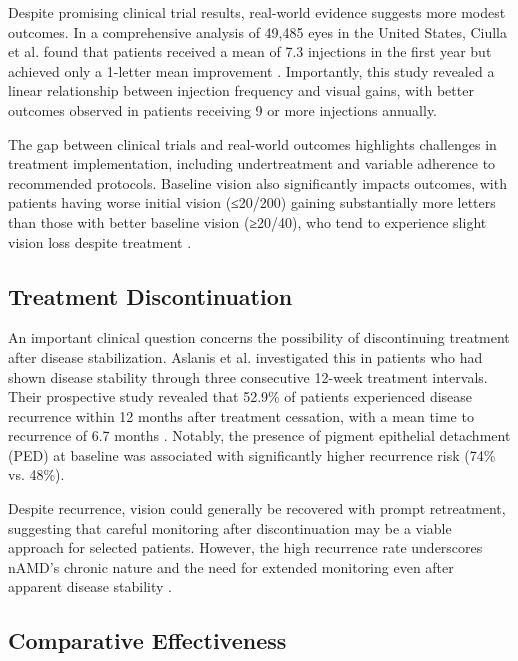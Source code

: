 Despite promising clinical trial results, real-world evidence suggests more modest outcomes. In a comprehensive analysis of 49,485 eyes in the United States, Ciulla et al. found that patients received a mean of 7.3 injections in the first year but achieved only a 1-letter mean improvement \citep{ciullaVisualAcuityOutcomes2020}. Importantly, this study revealed a linear relationship between injection frequency and visual gains, with better outcomes observed in patients receiving 9 or more injections annually.

The gap between clinical trials and real-world outcomes highlights challenges in treatment implementation, including undertreatment and variable adherence to recommended protocols. Baseline vision also significantly impacts outcomes, with patients having worse initial vision (≤20/200) gaining substantially more letters than those with better baseline vision (≥20/40), who tend to experience slight vision loss despite treatment \citep{ciullaVisualAcuityOutcomes2020}.

\subsection{Treatment Discontinuation}

An important clinical question concerns the possibility of discontinuing treatment after disease stabilization. Aslanis et al. investigated this in patients who had shown disease stability through three consecutive 12-week treatment intervals. Their prospective study revealed that 52.9\% of patients experienced disease recurrence within 12 months after treatment cessation, with a mean time to recurrence of 6.7 months \citep{aslanisRecurrentNeovascularAgeRelated2022}. Notably, the presence of pigment epithelial detachment (PED) at baseline was associated with significantly higher recurrence risk (74\% vs. 48\%).

Despite recurrence, vision could generally be recovered with prompt retreatment, suggesting that careful monitoring after discontinuation may be a viable approach for selected patients. However, the high recurrence rate underscores nAMD's chronic nature and the need for extended monitoring even after apparent disease stability \citep{aslanisRecurrentNeovascularAgeRelated2022}.

\subsection{Comparative Effectiveness}

